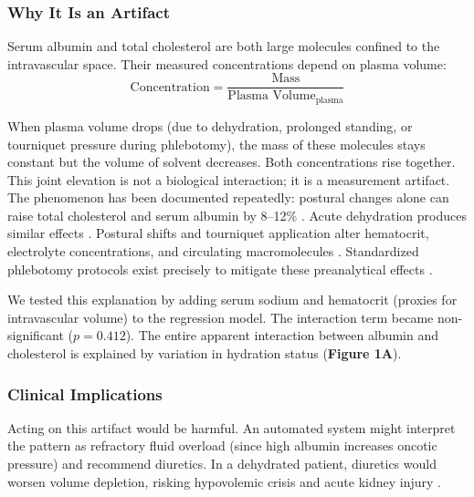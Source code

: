 \documentclass[10pt,letterpaper]{article}
\begin{document}
\subsubsection{Why It Is an Artifact}
Serum albumin and total cholesterol are both large molecules confined to the intravascular space. Their measured concentrations depend on plasma volume:
\begin{equation}
\text{Concentration} = \frac{\text{Mass}}{\text{Plasma Volume}_{\text{plasma}}}
\end{equation}

When plasma volume drops (due to dehydration, prolonged standing, or tourniquet pressure during phlebotomy), the mass of these molecules stays constant but the volume of solvent decreases. Both concentrations rise together. This joint elevation is not a biological interaction; it is a measurement artifact. The phenomenon has been documented repeatedly: postural changes alone can raise total cholesterol and serum albumin by 8--12\% \cite{tan1973, harrison1985, statland1974}. Acute dehydration produces similar effects \cite{thompson1980, nose1988}. Postural shifts and tourniquet application alter hematocrit, electrolyte concentrations, and circulating macromolecules \cite{maron1977, dixon1978, guder1996}. Standardized phlebotomy protocols exist precisely to mitigate these preanalytical effects \cite{simundic2018}.

We tested this explanation by adding serum sodium and hematocrit (proxies for intravascular volume) to the regression model. The interaction term became non-significant ($p = 0.412$). The entire apparent interaction between albumin and cholesterol is explained by variation in hydration status (\textbf{Figure 1A}).

\subsubsection{Clinical Implications}
Acting on this artifact would be harmful. An automated system might interpret the pattern as refractory fluid overload (since high albumin increases oncotic pressure) and recommend diuretics. In a dehydrated patient, diuretics would worsen volume depletion, risking hypovolemic crisis and acute kidney injury \cite{testani2010, testani2013}.
\end{document}

